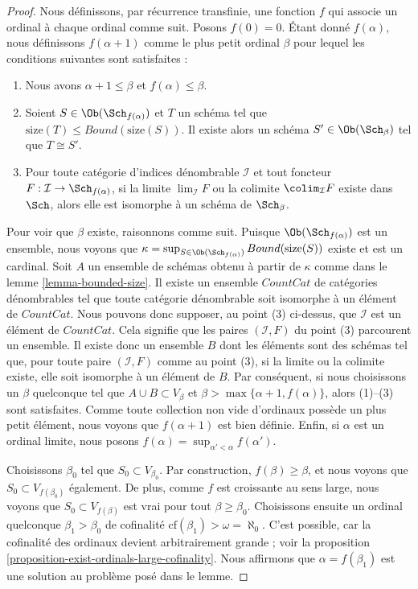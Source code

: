 \begin{proof}
Nous définissons, par récurrence transfinie, une fonction $f$ qui associe un
ordinal à chaque ordinal comme suit. Posons $f(0) = 0$. Étant donné
$f(\alpha)$, nous définissons $f(\alpha + 1)$ comme le plus petit ordinal
$\beta$ pour lequel les conditions suivantes sont satisfaites :
\begin{enumerate}
\item Nous avons $\alpha + 1 \leq \beta$ et $f(\alpha) \leq \beta$.
\item Soient $S \in \Ob(\Sch_{f(\alpha)})$ et $T$ un schéma tel que
$\text{size}(T) \leq Bound(\text{size}(S))$. Il existe alors un schéma
$S' \in \Ob(\Sch_\beta)$ tel que $T \cong S'$.
\item Pour toute catégorie d'indices dénombrable $\mathcal{I}$ et tout
foncteur $F : \mathcal{I} \to \Sch_{f(\alpha)}$, si la limite
$\lim_\mathcal{I} F$ ou la colimite $\colim_\mathcal{I} F$ existe dans
$\Sch$, alors elle est isomorphe à un schéma de $\Sch_\beta$.
\end{enumerate}
Pour voir que $\beta$ existe, raisonnons comme suit. Puisque
$\Ob(\Sch_{f(\alpha)})$ est un ensemble, nous voyons que
$\kappa =
\sup_{S \in \Ob(\Sch_{f(\alpha)})} Bound(\text{size}(S))$
existe et est un cardinal. Soit $A$ un ensemble de schémas obtenu à partir de
$\kappa$ comme dans le lemme \ref{lemma-bounded-size}. Il existe un ensemble
$CountCat$ de catégories dénombrables tel que toute catégorie dénombrable soit
isomorphe à un élément de $CountCat$. Nous pouvons donc supposer, au point (3)
ci-dessus, que $\mathcal{I}$ est un élément de $CountCat$. Cela signifie que
les paires $(\mathcal{I}, F)$ du point (3) parcourent un ensemble. Il existe
donc un ensemble $B$ dont les éléments sont des schémas tel que, pour toute
paire $(\mathcal{I}, F)$ comme au point (3), si la limite ou la colimite existe,
elle soit isomorphe à un élément de $B$. Par conséquent, si nous choisissons un
$\beta$ quelconque tel que $A \cup B \subset V_\beta$ et
$\beta > \max\{\alpha + 1, f(\alpha)\}$, alors (1)--(3) sont satisfaites.
Comme toute collection non vide d'ordinaux possède un plus petit élément, nous
voyons que $f(\alpha + 1)$ est bien définie. Enfin, si $\alpha$ est un ordinal
limite, nous posons
$f(\alpha) = \sup_{\alpha' < \alpha} f(\alpha')$.

\medskip\noindent
Choisissons $\beta_0$ tel que $S_0 \subset V_{\beta_0}$. Par construction,
$f(\beta) \geq \beta$, et nous voyons que
$S_0 \subset V_{f(\beta_0)}$ également. De plus, comme $f$ est croissante au
sens large, nous voyons que $S_0 \subset V_{f(\beta)}$ est vrai pour tout
$\beta \geq \beta_0$. Choisissons ensuite un ordinal quelconque
$\beta_1 > \beta_0$ de cofinalité
$\text{cf}(\beta_1) > \omega = \aleph_0$. C'est possible, car la cofinalité des
ordinaux devient arbitrairement grande ; voir la proposition
\ref{proposition-exist-ordinals-large-cofinality}. Nous affirmons que
$\alpha = f(\beta_1)$ est une solution au problème posé dans le lemme.


\end{proof}
